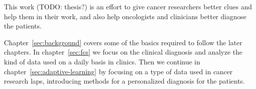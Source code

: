 This work (TODO: thesis?) is an effort to give cancer researchers better clues and help them in their work, and also help oncologists and clinicians better diagnose the patients.

Chapter~\ref{sec:background} covers some of the basics required to follow the later chapters. In chapter~\ref{sec:fcs} we focus on the clinical diagnosis and analyze the kind of data used on a daily basis in clinics. Then we continue in chapter~\ref{sec:adaptive-learning} by focusing on a type of data used in cancer research laps, introducing methods for a personalized diagnosis for the patients.

